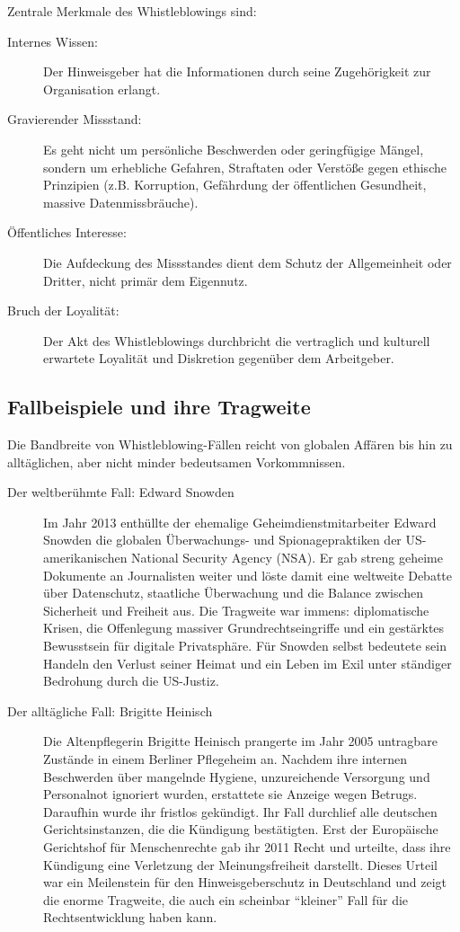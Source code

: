 \documentclass[
    12pt,               %
    a4paper,            %
    ngerman             %
]{scrartcl}
\begin{document}
Zentrale Merkmale des Whistleblowings sind:
\begin{description}
    \item[Internes Wissen:] Der Hinweisgeber hat die Informationen durch seine Zugehörigkeit zur Organisation erlangt.
    \item[Gravierender Missstand:] Es geht nicht um persönliche Beschwerden oder geringfügige Mängel, sondern um erhebliche Gefahren, Straftaten oder Verstöße gegen ethische Prinzipien (z.B. Korruption, Gefährdung der öffentlichen Gesundheit, massive Datenmissbräuche).
    \item[Öffentliches Interesse:] Die Aufdeckung des Missstandes dient dem Schutz der Allgemeinheit oder Dritter, nicht primär dem Eigennutz.
    \item[Bruch der Loyalität:] Der Akt des Whistleblowings durchbricht die vertraglich und kulturell erwartete Loyalität und Diskretion gegenüber dem Arbeitgeber.
\end{description}

\subsection{Fallbeispiele und ihre Tragweite}
Die Bandbreite von Whistleblowing-Fällen reicht von globalen Affären bis hin zu alltäglichen, aber nicht minder bedeutsamen Vorkommnissen.

\begin{description}
    \item[Der weltberühmte Fall: Edward Snowden] Im Jahr 2013 enthüllte der ehemalige Geheimdienstmitarbeiter Edward Snowden die globalen Überwachungs- und Spionagepraktiken der US-amerikanischen National Security Agency (NSA). Er gab streng geheime Dokumente an Journalisten weiter und löste damit eine weltweite Debatte über Datenschutz, staatliche Überwachung und die Balance zwischen Sicherheit und Freiheit aus. Die Tragweite war immens: diplomatische Krisen, die Offenlegung massiver Grundrechtseingriffe und ein gestärktes Bewusstsein für digitale Privatsphäre. Für Snowden selbst bedeutete sein Handeln den Verlust seiner Heimat und ein Leben im Exil unter ständiger Bedrohung durch die US-Justiz.
    
    \item[Der alltägliche Fall: Brigitte Heinisch] Die Altenpflegerin Brigitte Heinisch prangerte im Jahr 2005 untragbare Zustände in einem Berliner Pflegeheim an. Nachdem ihre internen Beschwerden über mangelnde Hygiene, unzureichende Versorgung und Personalnot ignoriert wurden, erstattete sie Anzeige wegen Betrugs. Daraufhin wurde ihr fristlos gekündigt. Ihr Fall durchlief alle deutschen Gerichtsinstanzen, die die Kündigung bestätigten. Erst der Europäische Gerichtshof für Menschenrechte gab ihr 2011 Recht und urteilte, dass ihre Kündigung eine Verletzung der Meinungsfreiheit darstellt. Dieses Urteil war ein Meilenstein für den Hinweisgeberschutz in Deutschland und zeigt die enorme Tragweite, die auch ein scheinbar \enquote{kleiner} Fall für die Rechtsentwicklung haben kann.
\end{description}
\end{document}
